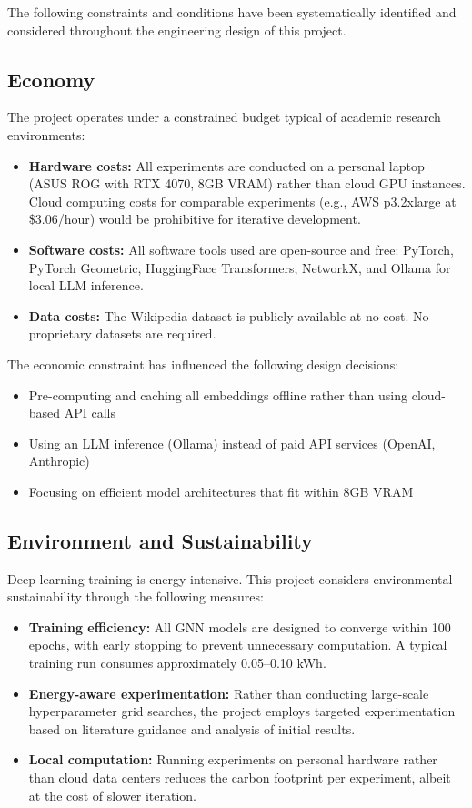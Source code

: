 The following constraints and conditions have been systematically identified and considered throughout the engineering design of this project.

\subsection{Economy}

The project operates under a constrained budget typical of academic research environments:

\begin{itemize}
    \item \textbf{Hardware costs:} All experiments are conducted on a personal laptop (ASUS ROG with RTX 4070, 8GB VRAM) rather than cloud GPU instances. Cloud computing costs for comparable experiments (e.g., AWS p3.2xlarge at \$3.06/hour) would be prohibitive for iterative development.
    \item \textbf{Software costs:} All software tools used are open-source and free: PyTorch, PyTorch Geometric, HuggingFace Transformers, NetworkX, and Ollama for local LLM inference.
    \item \textbf{Data costs:} The Wikipedia dataset is publicly available at no cost. No proprietary datasets are required.
\end{itemize}

The economic constraint has influenced the following design decisions:
\begin{itemize}
    \item Pre-computing and caching all embeddings offline rather than using cloud-based API calls
    \item Using an LLM inference (Ollama) instead of paid API services (OpenAI, Anthropic)
    \item Focusing on efficient model architectures that fit within 8GB VRAM
\end{itemize}

\subsection{Environment and Sustainability}

Deep learning training is energy-intensive. This project considers environmental sustainability through the following measures:

\begin{itemize}
    \item \textbf{Training efficiency:} All GNN models are designed to converge within 100 epochs, with early stopping to prevent unnecessary computation. A typical training run consumes approximately 0.05--0.10 kWh.
    \item \textbf{Energy-aware experimentation:} Rather than conducting large-scale hyperparameter grid searches, the project employs targeted experimentation based on literature guidance and analysis of initial results.
    \item \textbf{Local computation:} Running experiments on personal hardware rather than cloud data centers reduces the carbon footprint per experiment, albeit at the cost of slower iteration.
\end{itemize}

